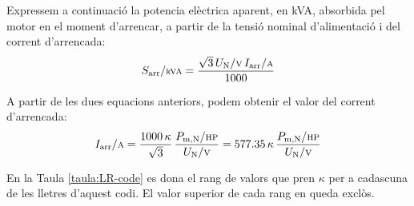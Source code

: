 Expressem a continuació la potencia elèctrica aparent, en kVA, absorbida pel motor en el moment d'arrencar, a partir de la tensió nominal d'alimentació i del corrent d'arrencada:
\begin{equation}
    S\ped{arr}/{\scriptstyle \si{kVA}} = \frac{\sqrt{3}\,U\ped{N}/{\scriptstyle \si{V}}\,I\ped{arr}/{\scriptstyle \si{A}}}{1000}
\end{equation}

A partir de les dues equacions anteriors, podem obtenir el valor del corrent d'arrencada:
\begin{equation}
    I\ped{arr}/{\scriptstyle \si{A}} = \frac{1000 \,\kappa}{\sqrt{3}} \,\frac{P\ped{m,N}/{\scriptstyle \si{HP}}}{U\ped{N}/{\scriptstyle \si{V}}} = \num{577,35}\,\kappa\,\frac{P\ped{m,N}/{\scriptstyle \si{HP}}}{U\ped{N}/{\scriptstyle \si{V}}}\label{eq:LR-code}
\end{equation}

En la Taula \vref{taula:LR-code} es dona el rang de valors que pren $\kappa$ per a cadascuna de les lletres d'aquest codi. El valor superior de cada rang en queda exclòs.

